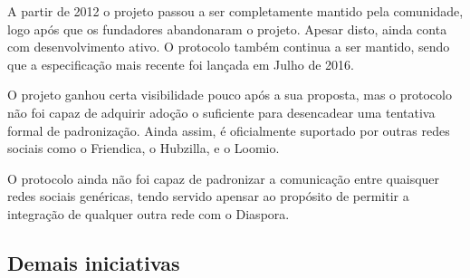 A partir de 2012 o projeto passou a ser completamente mantido pela comunidade, logo
após que os fundadores abandonaram o projeto. Apesar disto, ainda conta com
desenvolvimento ativo. O protocolo também continua a ser mantido, sendo que a
especificação mais recente foi lançada em Julho de 2016.

O projeto ganhou certa visibilidade pouco após a sua proposta, mas o protocolo não
foi capaz de adquirir adoção o suficiente para desencadear uma tentativa formal de
padronização. Ainda assim, é oficialmente suportado por outras redes sociais como o
Friendica, o Hubzilla, e o Loomio.

O protocolo ainda não foi capaz de padronizar a comunicação entre quaisquer redes
sociais genéricas, tendo servido apensar ao propósito de permitir a integração
de qualquer outra rede com o Diaspora.


\subsection{Demais iniciativas}

